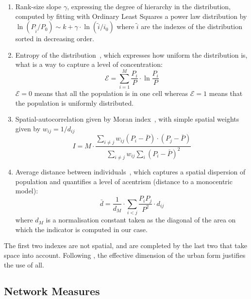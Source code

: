 \begin{enumerate}
\item Rank-size slope $\gamma$, expressing the degree of hierarchy in the distribution, computed by fitting with Ordinary Least Squares a power law distribution by $\ln \left( P_{\tilde{i}}/P_0\right) \sim k + \gamma\cdot \ln \left(\tilde{i}/i_0\right)$ where $\tilde{i}$ are the indexes of the distribution sorted in decreasing order.%
\item Entropy of the distribution~\citep{le2015forme}, which expresses how uniform the distribution is, what is a way to capture a level of concentration:
\begin{equation}
\mathcal{E} = \sum_{i=1}^{M}\frac{P_i}{P}\cdot \ln{\frac{P_i}{P}}
\end{equation}
$\mathcal{E}=0$ means that all the population is in one cell whereas $\mathcal{E}=1$ means that the population is uniformly distributed.
\item Spatial-autocorrelation given by Moran index~\cite{tsai2005quantifying}, with simple spatial weights given by $w_{ij} = 1/d_{ij}$
\[
I = M \cdot \frac{\sum_{i\neq j} w_{ij} \left(P_i - \bar{P}\right)\cdot\left(P_j - \bar{P}\right)}{\sum_{i\neq j} w_{ij} \sum_{i}{\left( P_i - \bar{P}\right)}^2}
\]
\item Average distance between individuals~\cite{le2009quantifier}, which captures a spatial dispersion of population and quantifies a level of acentrism (distance to a monocentric model):
\[
\bar{d} = \frac{1}{d_M}\cdot \sum_{i<j} \frac{P_i P_j}{P^2} \cdot d_{ij}
\]
where $d_M$ is a normalisation constant taken as the diagonal of the area on which the indicator is computed in our case.
\end{enumerate}


The first two indexes are not spatial, and are completed by the last two that take space into account. Following \cite{Schwarz201029}, the effective dimension of the urban form justifies the use of all.


\subsection{Network Measures}


